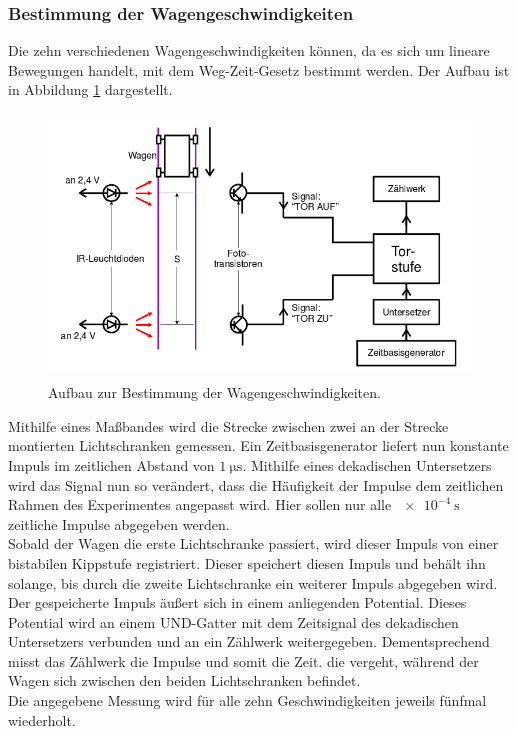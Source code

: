 \subsubsection{Bestimmung der Wagengeschwindigkeiten}
\label{sec:d1}
Die zehn verschiedenen Wagengeschwindigkeiten können, da es sich um lineare Bewegungen handelt, mit dem Weg-Zeit-Gesetz bestimmt werden.
Der Aufbau ist in Abbildung \ref{tfig:1} dargestellt.
\begin{figure}
  \centering
  \includegraphics[height=7cm]{aufbau1.png}
  \caption{Aufbau zur Bestimmung der Wagengeschwindigkeiten. \cite{sample}}
  \label{tfig:1}
\end{figure}
Mithilfe eines Maßbandes wird die Strecke zwischen zwei an der Strecke montierten Lichtschranken gemessen.
Ein Zeitbasisgenerator liefert nun konstante Impuls im zeitlichen Abstand von $\SI{1}{\micro\second}$.
Mithilfe eines dekadischen Untersetzers wird das Signal nun so verändert, dass die Häufigkeit der Impulse dem zeitlichen Rahmen des Experimentes angepasst wird.
Hier sollen nur alle $\SI{e-4}{\second}$ zeitliche Impulse abgegeben werden. \\
Sobald der Wagen die erste Lichtschranke passiert, wird dieser Impuls von einer bistabilen Kippstufe registriert.
Dieser speichert diesen Impuls und behält ihn solange, bis durch die zweite Lichtschranke ein weiterer Impuls abgegeben wird.
Der gespeicherte Impuls äußert sich in einem anliegenden Potential.
Dieses Potential wird an einem UND-Gatter mit dem Zeitsignal des dekadischen Untersetzers verbunden und an ein Zählwerk weitergegeben.
Dementsprechend misst das Zählwerk die Impulse und somit die Zeit. die vergeht, während der Wagen sich zwischen den beiden Lichtschranken befindet.\\
Die angegebene Messung wird für alle zehn Geschwindigkeiten jeweils fünfmal wiederholt.

